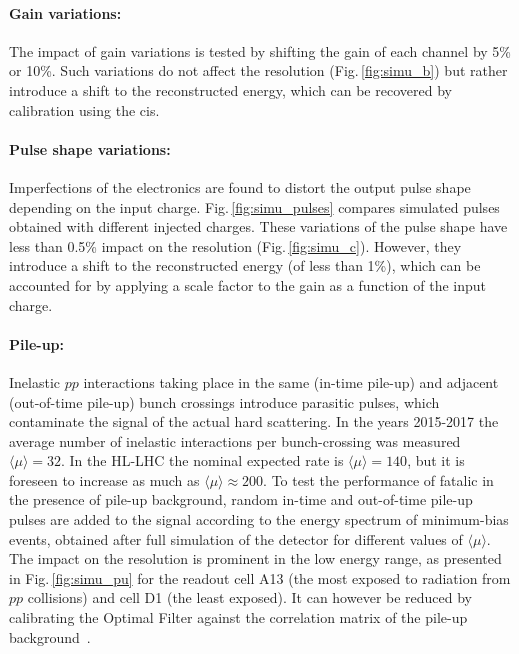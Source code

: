 \paragraph*{Gain variations:} The impact of gain variations is tested by shifting the gain of each channel by 5\% 
      or 10\%. Such variations do not affect the resolution (Fig.\,\ref{fig:simu_b}) but rather introduce a shift to 
      the reconstructed energy, which can be recovered by calibration using the \gls{cis}.

\paragraph*{Pulse shape variations:} Imperfections of the electronics are found to distort the output pulse shape
      depending on the input charge. Fig.\,\ref{fig:simu_pulses} compares simulated pulses obtained with different
      injected charges. These variations of the pulse shape have less than 0.5\% impact on the resolution 
      (Fig.\,\ref{fig:simu_c}). However, they introduce a shift to the reconstructed energy (of less than 1\%), which 
      can be accounted for by applying a scale factor to the gain as a function of the input charge.

\paragraph*{Pile-up:} Inelastic $pp$ interactions taking place in the same (in-time pile-up) and adjacent (out-of-time pile-up) 
      bunch crossings introduce parasitic pulses, which contaminate the signal of the actual hard scattering. In the years 
      2015-2017 the average number of inelastic interactions per bunch-crossing was measured $\langle\mu\rangle=32$. In the 
      HL-LHC the nominal expected rate is $\langle\mu\rangle=140$, but it is foreseen to increase as much as $\langle\mu\rangle\approx 200$. 
      To test the performance of \gls{fatalic} in the presence of pile-up background, random in-time and out-of-time pile-up 
      pulses are added to the signal according to the energy spectrum of minimum-bias events, obtained after full simulation 
      of the detector for different values of $\langle\mu\rangle$. The impact on the resolution is prominent in the low energy 
      range, as presented in Fig.\,\ref{fig:simu_pu} for the readout cell A13 (the most exposed to radiation from $pp$ collisions) 
      and cell D1 (the least exposed). It can however be reduced by calibrating the Optimal Filter against the correlation matrix 
      of the pile-up background~\cite{Fullana:2005dwa}.


